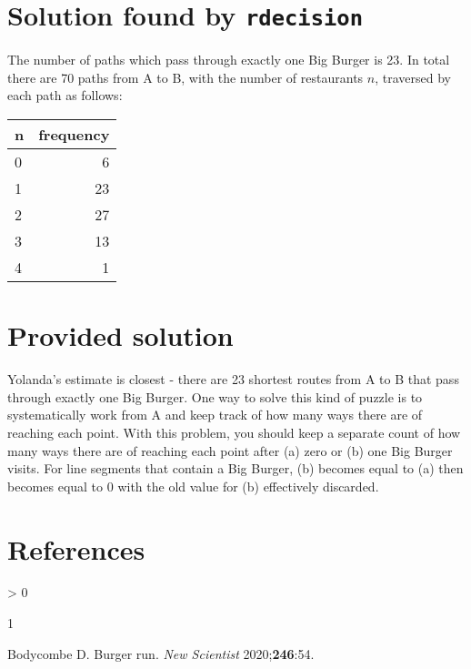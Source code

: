 \documentclass[
]{article}
\newlength{\cslhangindent}
\newlength{\csllabelwidth}
\newenvironment{CSLReferences}[2] %
 {%
  \setlength{\parindent}{0pt}
  \ifodd #1 \everypar{\setlength{\hangindent}{\cslhangindent}}\ignorespaces\fi
  \ifnum #2 > 0
  \setlength{\parskip}{#2\baselineskip}
  \fi
 }%
 {}
\newcommand{\CSLLeftMargin}[1]{\parbox[t]{\csllabelwidth}{#1}}
\newcommand{\CSLRightInline}[1]{\parbox[t]{\linewidth - \csllabelwidth}{#1}\break}
\begin{document}
\hypertarget{solution-found-by-rdecision}{%
\section{\texorpdfstring{Solution found by
\texttt{rdecision}}{Solution found by rdecision}}\label{solution-found-by-rdecision}}

The number of paths which pass through exactly one Big Burger is 23. In
total there are 70 paths from A to B, with the number of restaurants
\(n\), traversed by each path as follows:

\begin{longtable}[]{@{}lr@{}}
\toprule
n & frequency\tabularnewline
\midrule
\endhead
0 & 6\tabularnewline
1 & 23\tabularnewline
2 & 27\tabularnewline
3 & 13\tabularnewline
4 & 1\tabularnewline
\bottomrule
\end{longtable}

\hypertarget{provided-solution}{%
\section{Provided solution}\label{provided-solution}}

Yolanda's estimate is closest - there are 23 shortest routes from A to B
that pass through exactly one Big Burger. One way to solve this kind of
puzzle is to systematically work from A and keep track of how many ways
there are of reaching each point. With this problem, you should keep a
separate count of how many ways there are of reaching each point after
(a) zero or (b) one Big Burger visits. For line segments that contain a
Big Burger, (b) becomes equal to (a) then becomes equal to 0 with the
old value for (b) effectively discarded.

\hypertarget{references}{%
\section*{References}\label{references}}

\hypertarget{refs}{}
\begin{CSLReferences}{0}{0}
\leavevmode\hypertarget{ref-bodycombe2020}{}%
\CSLLeftMargin{1 }
\CSLRightInline{Bodycombe D. Burger run. \emph{New Scientist}
2020;\textbf{246}:54.}

\end{CSLReferences}
\end{document}
